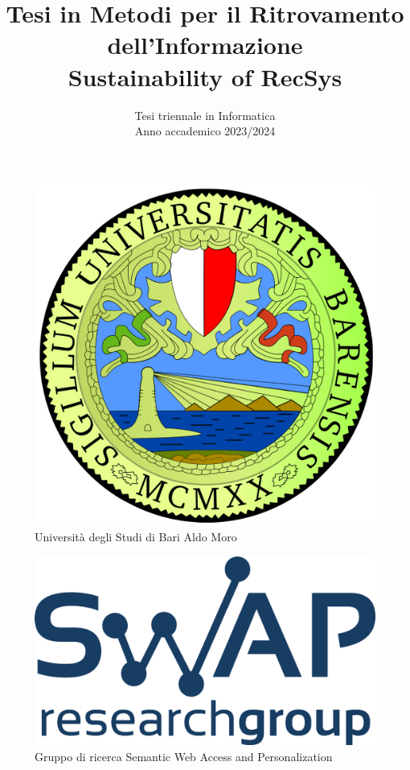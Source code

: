\documentclass[12pt]{article}
\begin{document}

    \pagestyle{fancy}
    \everymath{\displaystyle}
    \sffamily
    \begin{figure}
        \centering
        \includegraphics[scale=0.1]{images/uniba-logo.png}
        \caption*{Università degli Studi di Bari Aldo Moro}
    \end{figure}
    \begin{figure}
        \centering
        \includegraphics[scale=0.1]{images/swap.png}
        \caption*{Gruppo di ricerca Semantic Web Access and Personalization}
    \end{figure}
    

    \title{
        Tesi in Metodi per il Ritrovamento dell'Informazione\\   
    \textbf{Sustainability of RecSys}}
    \date{Tesi triennale in Informatica\\Anno accademico 2023/2024}
    \maketitle
\end{document}

